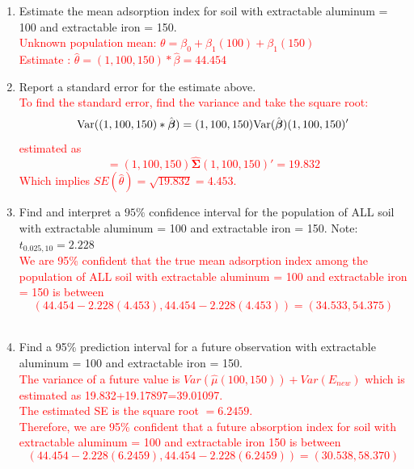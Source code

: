 \begin{enumerate}
\item Estimate the mean adsorption index for soil with extractable aluminum = 100 and extractable iron = 150.  %
\textcolor{red}{\\Unknown population mean: $\theta=\beta_0+\beta_1(100) +\beta_1(150)$ \\
Estimate : $\hat\theta=(1,100,150)* \hat\beta = 44.454$\\}
\item Report a standard error for the estimate above.%
\textcolor{red}{\\To find the standard error, find the variance and take the square root:
$$\mbox{Var}((1,100,150) * \hat{\boldsymbol{\beta}}) = (1,100,150)\mbox{Var}(\hat{\boldsymbol{\beta}}) (1,100,150)'$$
estimated as
$$= (1,100,150)\widehat{\boldsymbol{\Sigma}} (1,100,150)'=19.832$$
Which implies $SE(\hat\theta) = \sqrt{19.832}=4.453$.\\}
\item Find and interpret a $95\%$ confidence interval for the population of ALL soil with extractable aluminum = 100 and extractable iron = 150.  Note: $t_{0.025, 10}=2.228$%
\textcolor{red}{\\
We are 95\% confident that the true mean adsorption index among the population of ALL soil with extractable aluminum = 100 and extractable iron = 150 is between 
$$(44.454-2.228(4.453), 44.454-2.228(4.453)) = (34.533, 54.375)$$~\\}
\item Find a 95\% prediction interval for a future observation with extractable aluminum = 100 and extractable iron = 150.  %
\textcolor{red}{\\
The variance of a future value is $Var(\hat{\mu}(100,150))+Var(E_{new})$ which is estimated as 19.832+19.17897=39.01097.  \\
The estimated SE is the square root $ = 6.2459$.  \\
Therefore, we are 95\% confident that a future absorption index for soil with extractable aluminum = 100 and extractable iron  150 is between 
$$(44.454-2.228(6.2459), 44.454-2.228(6.2459)) = (30.538, 58.370)$$}
\end{enumerate}


